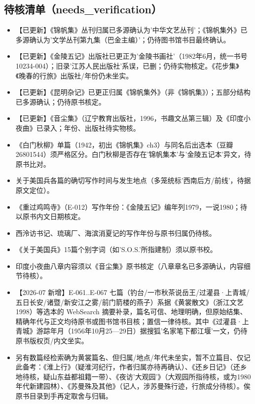 \documentclass[UTF8,fontset=none,zihao=-4,a4paper]{ctexart}
\begin{document}
\subsection{待核清单（needs\_verification）}
\begin{itemize}
\item 【已更新】《锦帆集》丛刊归属已多源确认为'中华文艺丛刊'；《锦帆集外》已多源确认为'文学丛刊第九集（巴金主编）'；仍待图书馆书目最终确认。
\item 【已更新】《金陵五记》出版社已更正为'金陵书画社'（1982年6月，统一书号10234-004）；旧录'江苏人民出版社'系误，已删；仍待实物核定。《花步集》《晚春的行旅》出版社/年份仍未坐实。
\item 【已更新】《昆明杂记》已更正归属《锦帆集外》（非《锦帆集》）；五部分结构已多源确认；仍待原书核定。
\item 【已更新】《音尘集》（辽宁教育出版社，1996，书趣文丛第三辑）及《印度小夜曲》已录入；年份、出版社待实物核。
\item 《白门秋柳》单篇（1942，初出《锦帆集》ch3）与同名后出选本（豆瓣26801544）须严格区分。白门秋柳是否存在'锦帆集本'与'金陵五记本'异文，待原书比对。
\item 关于美国兵各篇的确切写作时间与发生地点（多笼统标'西南后方/前线'，待据原文定位）。
\item 《重过鸡鸣寺》（E-012）写作年份：《金陵五记》编年列1979，一说1980；待以原书内文日期核定。
\item 西泠访书记、琉璃厂、海滨消夏记的写作年份与原书归属仍待核。
\item 《关于美国兵》15篇个别字词（如'S.O.S.'所指建制）须以原书校。
\item 印度小夜曲八章内容须以《音尘集》原书核定（八章章名已多源确认，内容细节待核）。
\item 【2026-07 新增】E-061..E-067 七篇（钓台/一市秋茶说岳王/过灌县·上青城/五日长安/诸暨/新安江之雾/前门箭楼的燕子）系据《黄裳散文》（浙江文艺1998）等选本的 WebSearch 摘要补录，篇名可信、地理明确，但原始结集、精确年代与正文均待原书或图书馆书目核；置信一律待核。其中《过灌县·上青城》游踪年月（1956年10月25—29日）据搜狐'名家笔下都江堰'一文，仍待原书版权页/内文坐实。
\item 另有数篇经检索确为黄裳篇名、但归属/地点/年代未坐实，暂不立篇目、仅记此备考：《淮上行》（疑淮河纪行，作者归属亦待再确认）、《还乡日记》（还乡地待核，疑山东益都祖籍一带）、《夜访'大观园'》（大观园所指待核，或为1980年代新建园林）、《苏曼殊及其他》（记人，涉苏曼殊行迹，行旅成分待核）。俟原书目录到手再定取舍与归辑。
\end{itemize}
\end{document}
